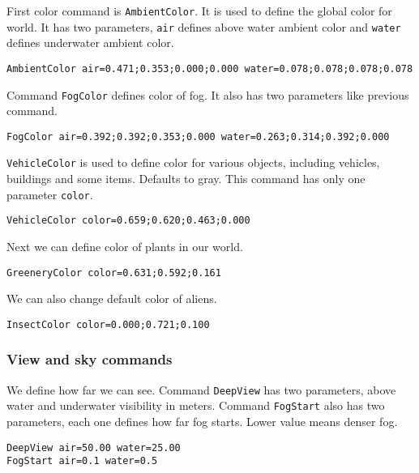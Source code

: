 First color command is \verb|AmbientColor|. It is used to define the global color for world. It has two parameters, \verb|air| defines above water ambient color and \verb|water| defines underwater ambient color.

\begin{lstlisting}[style=scene]
AmbientColor air=0.471;0.353;0.000;0.000 water=0.078;0.078;0.078;0.078
\end{lstlisting}


Command \verb|FogColor| defines color of fog. It also has two parameters like previous command.

\begin{lstlisting}[style=scene]
FogColor air=0.392;0.392;0.353;0.000 water=0.263;0.314;0.392;0.000
\end{lstlisting}

\verb|VehicleColor| is used to define color for various objects, including vehicles, buildings and some items. Defaults to gray. This command has only one parameter \verb|color|.

\begin{lstlisting}[style=scene]
VehicleColor color=0.659;0.620;0.463;0.000
\end{lstlisting}

Next we can define color of plants in our world.

\begin{lstlisting}[style=scene]
GreeneryColor color=0.631;0.592;0.161
\end{lstlisting}

We can also change default color of aliens.

\begin{lstlisting}[style=scene]
InsectColor color=0.000;0.721;0.100
\end{lstlisting}


\subsubsection{View and sky commands}

We define how far we can see. Command \texttt{DeepView} has two parameters, above water and underwater visibility in meters. Command \texttt{FogStart} also has two parameters, each one defines how far fog starts. Lower value means denser fog.

\begin{lstlisting}[style=scene]
DeepView air=50.00 water=25.00
FogStart air=0.1 water=0.5
\end{lstlisting}

